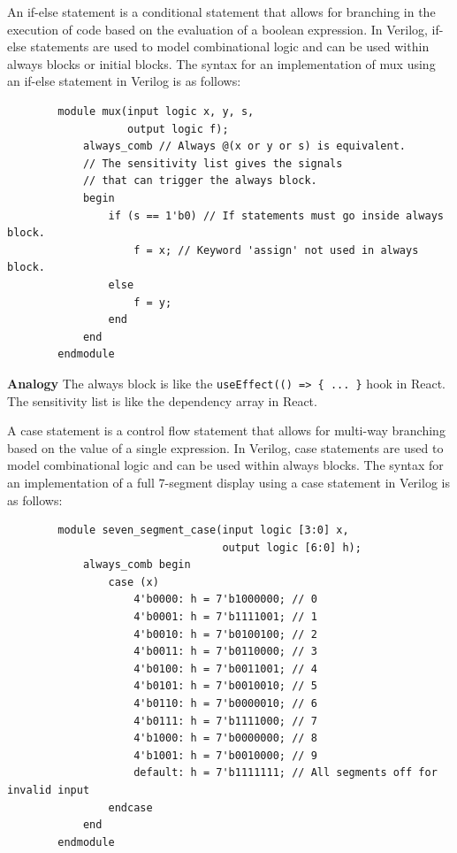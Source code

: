 \documentclass[11pt]{report}
\begin{document}
\begin{definition}
    An if-else statement is a conditional statement that allows for branching in the execution of code based on the evaluation of a boolean expression. In Verilog, if-else statements are used to model combinational logic and can be used within always blocks or initial blocks. The syntax for an implementation of mux using an if-else statement in Verilog is as follows:
    \begin{verbatim}
        module mux(input logic x, y, s,
                   output logic f);
            always_comb // Always @(x or y or s) is equivalent.
            // The sensitivity list gives the signals
            // that can trigger the always block.
            begin
                if (s == 1'b0) // If statements must go inside always block.
                    f = x; // Keyword 'assign' not used in always block.
                else
                    f = y;
                end
            end
        endmodule
    \end{verbatim}
    \textbf{Analogy} The always block is like the \verb|useEffect(() => { ... }| hook in React. The sensitivity list is like the dependency array in React.
\end{definition}

\begin{definition}
    A case statement is a control flow statement that allows for multi-way branching based on the value of a single expression. In Verilog, case statements are used to model combinational logic and can be used within always blocks. The syntax for an implementation of a full 7-segment display using a case statement in Verilog is as follows:
    \begin{verbatim}
        module seven_segment_case(input logic [3:0] x,
                                  output logic [6:0] h);
            always_comb begin
                case (x) 
                    4'b0000: h = 7'b1000000; // 0
                    4'b0001: h = 7'b1111001; // 1
                    4'b0010: h = 7'b0100100; // 2
                    4'b0011: h = 7'b0110000; // 3
                    4'b0100: h = 7'b0011001; // 4
                    4'b0101: h = 7'b0010010; // 5
                    4'b0110: h = 7'b0000010; // 6
                    4'b0111: h = 7'b1111000; // 7
                    4'b1000: h = 7'b0000000; // 8
                    4'b1001: h = 7'b0010000; // 9
                    default: h = 7'b1111111; // All segments off for invalid input
                endcase
            end
        endmodule
    \end{verbatim}


\end{definition}
\end{document}
